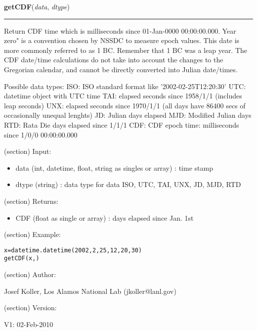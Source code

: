 \hspace{.8\funcindent}\begin{boxedminipage}{\funcwidth}

    \raggedright \textbf{getCDF}(\textit{data}, \textit{dtype})

    \vspace{-1.5ex}

    \rule{\textwidth}{0.5\fboxrule}
\setlength{\parskip}{2ex}
    Return CDF time which is milliseconds since 01-Jan-0000 00:00:00.000. 
    Year zero" is a convention chosen by NSSDC to measure epoch values. 
    This date is more commonly referred to as 1 BC. Remember that 1 BC was 
    a leap year. The CDF date/time calculations do not take into account 
    the changes to the Gregorian calendar, and cannot be directly converted
    into Julian date/times.

    Possible data types: ISO: ISO standard format like 
    '2002-02-25T12:20:30' UTC: datetime object with UTC time TAI: elapsed 
    seconds since 1958/1/1 (includes leap seconds) UNX: elapsed seconds 
    since 1970/1/1 (all days have 86400 secs of occasionally unequal 
    lenghts) JD: Julian days elapsed MJD: Modified Julian days RTD: Rata 
    Die days elapsed since 1/1/1 CDF: CDF epoch time: milliseconds since 
    1/0/0 00:00:00.000

    (section) Input:

      \begin{itemize}
      \setlength{\parskip}{0.6ex}
        \item data (int, datetime, float, string as singles or array) : time 
          stamp

        \item dtype (string) : data type for data ISO, UTC, TAI, UNX, JD, MJD, 
          RTD

      \end{itemize}

    (section) Returns:

      \begin{itemize}
      \setlength{\parskip}{0.6ex}
        \item CDF (float as single or array) : days elapsed since Jan. 1st

      \end{itemize}

    (section) Example:

\begin{alltt}
\pysrcprompt{{\textgreater}{\textgreater}{\textgreater} }x=datetime.datetime(2002,2,25,12,20,30)
\pysrcprompt{{\textgreater}{\textgreater}{\textgreater} }getCDF(x, )\end{alltt}
    (section) Author:

      Josef Koller, Los Alamos National Lab (jkoller@lanl.gov)

    (section) Version:

      V1: 02-Feb-2010

\setlength{\parskip}{1ex}
    \end{boxedminipage}

